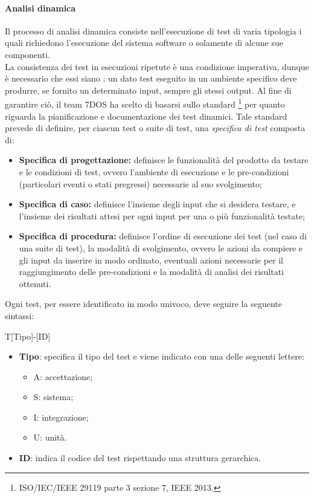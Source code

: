 \paragraph{Analisi dinamica}\Spazio
Il processo di analisi dinamica consiste nell'esecuzione di test di varia tipologia i quali richiedono l'esecuzione del sistema software o solamente di alcune sue componenti. \\
La consistenza dei test in esecuzioni ripetute è una condizione imperativa, dunque è necessario che essi siano : un dato test eseguito in un ambiente specifico deve produrre, se fornito un determinato input, sempre gli stessi output. Al fine di garantire ciò, il team 7DOS ha scelto di basarsi sullo standard \footnote{ISO/IEC/IEEE 29119 parte 3 sezione 7, IEEE 2013.} per quanto riguarda la pianificazione e documentazione dei test dinamici. Tale standard prevede di definire, per ciascun test o suite di test, una \emph{specifica di test} composta di:
\begin{itemize}
	\item {\textbf{Specifica di progettazione:} definisce le funzionalità del prodotto da testare e le condizioni di test, ovvero l'ambiente di esecuzione e le pre-condizioni (particolari eventi o stati pregressi) necessarie al suo svolgimento;}
	\item {\textbf{Specifica di caso:} definisce l'insieme degli input che si desidera testare, e l'insieme dei risultati attesi per ogni input per una o più funzionalità testate;}
	\item {\textbf{Specifica di procedura:} definisce l'ordine di esecuzione dei test (nel caso di una suite di test), la modalità di svolgimento, ovvero le azioni da compiere e gli input da inserire in modo ordinato, eventuali azioni necessarie per il raggiungimento delle pre-condizioni e la modalità di analisi dei risultati ottenuti.}
\end{itemize}

Ogni test, per essere identificato in modo univoco, deve seguire la seguente sintassi:
\begin{center}
	T[Tipo]-[ID]
\end{center}
\begin{itemize}
	\item \textbf{Tipo}: specifica il tipo del test	e viene indicato con una delle seguenti lettere:
	\begin{itemize}
		\item A: accettazione;
		\item S: sistema;
		\item I: integrazione;
		\item U: unità.
	\end{itemize}
	\item \textbf{ID}: indica il codice del test rispettando una struttura gerarchica.	
\end{itemize}

